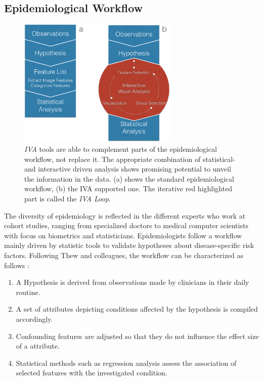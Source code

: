 \documentclass[journal]{style/vgtc} 			          %
\begin{document}
\subsection{Epidemiological Workflow} \label{EpidemiologicalWorkflow}
\begin{figure}[htb]
 \centering
 \includegraphics[width=3.0in]{figures/workflow_comparison}
 \caption{\emph{IVA} tools are able to complement parts of the epidemiological workflow, not replace it. The appropriate combination of statistical- and interactive driven analysis shows promising potential to unveil the information in the data. (a) shows the standard epidemiological workflow, (b) the IVA supported one. The iterative red highlighted part is called the \emph{IVA Loop}.}
  \label{fig:WorkflowComparison}
\end{figure}
The diversity of epidemiology is reflected in the different experts who work at cohort studies, ranging from specialized doctors to medical computer scientists with focus on biometrics and statisticians.
%
Epidemiologists follow a workflow mainly driven by statistic tools to validate hypotheses about disease-specific risk factors.
%
Following Thew and colleagues, the workflow can be characterized as follows \cite{Thew2009}:
%
\begin{enumerate}
	\item A Hypothesis is derived from observations made by clinicians in their daily routine.
%
	\item A set of attributes depicting conditions affected by the hypothesis is compiled accordingly.
	\item Confounding features are adjusted so that they do not influence the effect size of a attribute.
%
	\item Statistical methods such as regression analysis assess the association of selected features with the investigated condition.%
\end{enumerate}
\end{document}
